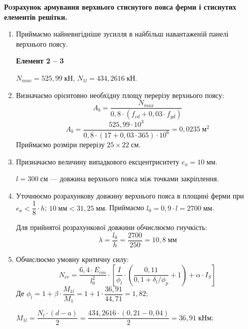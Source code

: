 \documentclass[a4paper,14pt]{article}
\begin{document}
        \textbf{Рoзрахунок армування верхнього стиснутого пояса ферми і стиснутих елементів решітки.}
\begin{enumerate}
    \item Приймаємо найневигідніше зусилля в найбільш навантаженій панелі\\верхнього поясу.
    
        \textbf{Елемент 2 -- 3}

        $N_{max} = 525,99\;\textit{кН}$, $N_{1l} = 434,2616\;\textit{кН}$.
    \item Визначаємо орієнтовно необхідну площу перерізу верхнього поясу:
        \begin{equation}
            A_b = \dfrac{N_{max}}{0,8 \cdot (f_{cd} + 0,03 \cdot f_{yd})}
        \end{equation}
        $$A_b = \dfrac{525,99 \cdot 10^3}{0,8 \cdot (17 + 0,03 \cdot 365) \cdot 10^6} = 0,0235\;\textit{м}^2$$
        Приймаємо розміри перерізу $25 \times 22\;\textit{см}$.
    \item Призначаємо величину випадкового ексцентриситету $e_a = 10\;\textit{мм}$.
        
        $l = 300\;\textit{см}$ --- довжина верхнього пояса між точками закріплення.
    \item Уточнюємо розрахункову довжину верхнього пояса в площині ферми при $e_a < \dfrac{1}{8} \cdot h$; $10\;\textit{мм} < 31,25\;\textit{мм}$. Приймаємо $l_0 = 0,9 \cdot l = 2700\;\textit{мм}$.

        Для прийнятої розрахункової довжини обчислюємо гнучкість:
        \begin{equation}
            \lambda = \dfrac{l_0}{h} = \dfrac{2700}{250} = 10,8\;\textit{мм}
        \end{equation}
    \item Обчислюємо умовну критичну силу:
        \begin{equation}
            N_{cr} = \dfrac{6,4 \cdot E_{cm}}{l_0^2} \cdot \left[\dfrac{I}{\phi_l} \cdot \left(\dfrac{0,11}{0,1 + \delta_l / \phi_p} + 1\right) + \alpha \cdot I_S\right]
        \end{equation}
        Де $\phi_l = 1 + \beta \cdot \dfrac{M_{1l}}{M_1} = 1 + 1 \cdot \dfrac{36,91}{44,71} = 1,82$;

        $M_{1l} = \dfrac{N_l \cdot (d - a)}{2} = \dfrac{434,2616 \cdot (0,21 - 0,04)}{2} = 36,91\;\textit{кНм}$;
        

\end{enumerate}
\end{document}
